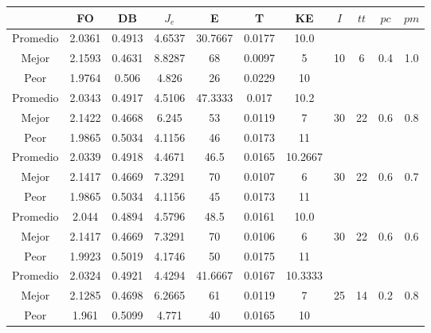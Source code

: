 \begin{table}[h!]
    \footnotesize
    \begin{center}
        \begin{tabular}{|c|c|c|c|c|c|c|c|c|c|c|}
        \hline
             & {\bf FO} & {\bf DB} & $J_e$ & {\bf E} & {\bf T} & {\bf KE} & $I$ & $tt$ & $pc$ & $pm$ \\
        \hline
        \hline
            Promedio  & 2.0361 & 0.4913 & 4.6537 & 30.7667 & 0.0177 & 10.0 &  &  &  & \\
            \cline{1-7}
            Mejor & 2.1593 & 0.4631  & 8.8287 & 68 & 0.0097 & 5 & 10 & 6 & 0.4 & 1.0\\
            \cline{1-7}
            Peor & 1.9764 & 0.506  & 4.826 & 26 & 0.0229 & 10 &  &  &  & \\
        \hline
        \hline
            Promedio  & 2.0343 & 0.4917 & 4.5106 & 47.3333 & 0.017 & 10.2 &  &  &  & \\
            \cline{1-7}
            Mejor & 2.1422 & 0.4668  & 6.245 & 53 & 0.0119 & 7 & 30 & 22 & 0.6 & 0.8\\
            \cline{1-7}
            Peor & 1.9865 & 0.5034  & 4.1156 & 46 & 0.0173 & 11 &  &  &  & \\
        \hline
        \hline
            Promedio  & 2.0339 & 0.4918 & 4.4671 & 46.5 & 0.0165 & 10.2667 &  &  &  & \\
            \cline{1-7}
            Mejor & 2.1417 & 0.4669  & 7.3291 & 70 & 0.0107 & 6 & 30 & 22 & 0.6 & 0.7\\
            \cline{1-7}
            Peor & 1.9865 & 0.5034  & 4.1156 & 45 & 0.0173 & 11 &  &  &  & \\
        \hline
        \hline
            Promedio  & 2.044 & 0.4894 & 4.5796 & 48.5 & 0.0161 & 10.0 &  &  &  & \\
            \cline{1-7}
            Mejor & 2.1417 & 0.4669  & 7.3291 & 70 & 0.0106 & 6 & 30 & 22 & 0.6 & 0.6\\
            \cline{1-7}
            Peor & 1.9923 & 0.5019  & 4.1746 & 50 & 0.0175 & 11 &  &  &  & \\
        \hline
        \hline
            Promedio  & 2.0324 & 0.4921 & 4.4294 & 41.6667 & 0.0167 & 10.3333 &  &  &  & \\
            \cline{1-7}
            Mejor & 2.1285 & 0.4698  & 6.2665 & 61 & 0.0119 & 7 & 25 & 14 & 0.2 & 0.8\\
            \cline{1-7}
            Peor & 1.961 & 0.5099  & 4.771 & 40 & 0.0165 & 10 &  &  &  & \\

\end{tabular}
\end{center}
\end{table}
